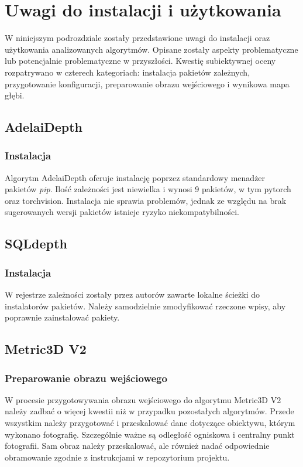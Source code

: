 \section{Uwagi do instalacji i użytkowania}
W niniejszym podrozdziale zostały przedstawione uwagi do instalacji oraz użytkowania analizowanych algorytmów. Opisane zostały aspekty problematyczne lub potencjalnie problematyczne w przyszłości. Kwestię subiektywnej oceny rozpatrywano w czterech kategoriach: instalacja pakietów zależnych, przygotowanie konfiguracji, preparowanie obrazu wejściowego i wynikowa mapa głębi.

\subsection{AdelaiDepth}
\subsubsection{Instalacja}
Algorytm AdelaiDepth oferuje instalację poprzez standardowy menadżer pakietów \textit{pip}. Ilość zależności jest niewielka i wynosi 9 pakietów, w tym pytorch oraz torchvision. Instalacja nie sprawia problemów, jednak ze względu na brak sugerowanych wersji pakietów istnieje ryzyko niekompatybilności.

\subsection{SQLdepth}
\subsubsection{Instalacja}
W rejestrze zależności zostały przez autorów zawarte lokalne ścieżki do instalatorów pakietów. Należy samodzielnie zmodyfikować rzeczone wpisy, aby poprawnie zainstalować pakiety.

\subsection{Metric3D V2}
\subsubsection{Preparowanie obrazu wejściowego}
W procesie przygotowywania obrazu wejściowego do algorytmu Metric3D V2 należy zadbać o więcej kwestii niż w przypadku pozostałych algorytmów. Przede wszystkim należy przygotować i przeskalować dane dotyczące obiektywu, którym wykonano fotografię. Szczególnie ważne są odległość ogniskowa i centralny punkt fotografii. Sam obraz należy przeskalować, ale również nadać odpowiednie obramowanie zgodnie z instrukcjami w repozytorium projektu.


